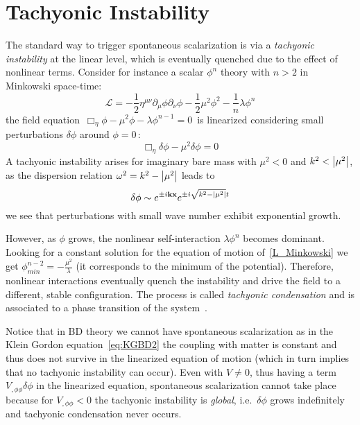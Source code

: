 \section{Tachyonic Instability}
The standard way to trigger spontaneous scalarization is via a \textit{tachyonic instability} at the linear level, which is
eventually quenched due to the eﬀect of nonlinear terms. Consider for instance a scalar $\phi^n$ theory with $n>2$ in Minkowski space-time:
\begin{equation} \label{L_Minkowski}
    \mathcal{L}= -\frac{1}{2} \eta^{\mu \nu} \partial_\mu \phi\partial_\nu \phi - \frac{1}{2} \mu^2 \phi^2 - \frac{1}{n}\lambda \phi^n
\end{equation}
the field equation $\,\Box_\eta \phi - \mu^2 \phi - \lambda \phi^{n-1}=0\,$ is linearized considering small 
perturbations $\delta \phi$ around $\phi = 0 \,$:
\begin{equation}\label{Linearised_field_eq}
    \Box_\eta \delta\phi - \mu^2 \delta\phi = 0
\end{equation}
A tachyonic instability arises for imaginary bare mass with $\mu^2<0$ and $k^2 < \abs{\mu^2}$, 
as the dispersion relation $\omega^2 = k^2 - \abs{\mu^2}$ leads to 
\begin{equation}
    \delta \phi \sim e^{\pm i \bf{k}\bf{x}} e^{\pm i\sqrt{k^2- \abs{\mu^2}}t}
\end{equation}
we see that perturbations with small wave number exhibit exponential growth.

However, as $\phi$ grows, the nonlinear self-interaction $\lambda \phi^n$ becomes dominant. 
Looking for a constant solution for the equation of motion of~\eqref{L_Minkowski} we get 
$\phi_{min}^{n-2} = -\frac{\mu^2}{\lambda}$ 
(it corresponds to the minimum of the potential).
Therefore, nonlinear interactions eventually quench the instability and
drive the field to a different, stable configuration. The process is called 
\textit{tachyonic condensation} and is associated to a phase transition of
the system~\cite{Doneva_2024}.

Notice that in BD theory we cannot have spontaneous scalarization as in the Klein Gordon equation~\eqref{eq:KGBD2} the coupling with matter is constant and thus does not survive in the linearized equation of motion (which in turn implies that no tachyonic instability can occur). Even with $V \neq 0$, thus having a term $V_{,\phi\phi}\delta \phi$ in the linearized equation, spontaneous scalarization cannot take place because for $V_{,\phi\phi}<0$ the tachyonic instability is \textit{global}, i.e.\ $\delta \phi$ grows indefinitely and tachyonic condensation never occurs. 

